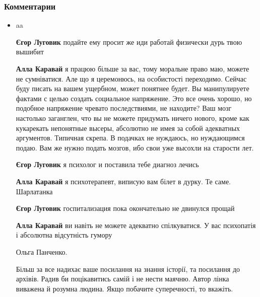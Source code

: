  
 
 
 
 
\clearpage
\subsubsection{Комментарии}
\label{sec:18_06_2020.fb.zharkih_ekaterina.1.mova_jazyk.cmt}

\begin{itemize}
\item aa

\begin{itemize}

\textbf{Єгор Луговик} подайте ему просит же иди работай физически дурь твою вышибит

\textbf{Алла Каравай} я працюю більше за вас, тому моральне право маю, можете
не сумніватися. Але що я церемонюсь, на особистості переходимо. Сейчас буду
писать на вашем ущербном, может понятнее будет. Вы манипулируете фактами с
целью создать социальное напряжение. Это все очень хорошо, но подобное
напряжение чревато последствиями, не находите? Ваш мозг настолько заганглен,
что вы не можете придумать ничего нового, кроме как кукарекать непонятные
высеры, абсолютно не имея за собой адекватных аргументов. Типичная скрепа. В
подачках не нуждаюсь, но нуждающимся подаю. Вам же нужно подать мозгов, ибо
свои уже высохли на старости лет.

\textbf{Єгор Луговик} я психолог и поставила тебе диагноз лечись

\textbf{Алла Каравай} я психотерапевт, виписую вам білет в дурку. Те саме. Шарлатанка

\textbf{Єгор Луговик} госпитализация пока окончательно не двинулся прощай

\textbf{Алла Каравай} ви навіть не можете адекватно спілкуватися. У вас психопатія і абсолютна відсутність гумору

Ольга Панченко.

Більш за все надихає ваше посилання на знання історії, та посилання до архівів.
Радив би поцікавитись самій і не нести маячню.  Автор лінка виважена й розумна
людина. Якщо побачите суперечності, то вкажіть.


\end{itemize}
\end{itemize}
